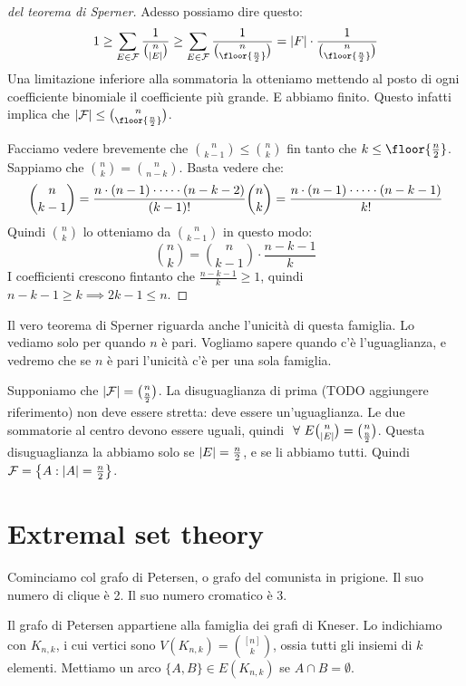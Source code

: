 \begin{proof}[del teorema di Sperner]
	Adesso possiamo dire questo:
	\[
		1 \ge \sum_{E \in \mathcal{F}} \frac{1}{\binom{n}{\abs{E}}} \ge \sum_{E \in \mathcal{F}} \frac{1}{\binom{n}{\floor{\frac{n}{2}}}} = \abs{F} \cdot \frac{1}{\binom{n}{\floor{\frac{n}{2}}}}
	\]
	Una limitazione inferiore alla sommatoria la otteniamo mettendo al posto di ogni coefficiente binomiale il coefficiente pi\`u grande.
	E abbiamo finito.
	Questo infatti implica che $\abs{\mathcal{F}} \le \binom{n}{\floor{\frac{n}{2}}}$.

	Facciamo vedere brevemente che $\binom{n}{k-1} \le \binom{n}{k}$ fin tanto che $k \le \floor{\frac{n}{2}}$.
	Sappiamo che $\binom{n}{k} = \binom{n}{n - k}$.
	Basta vedere che:
	\[
		\binom{n}{k-1} = \frac{n \cdot (n-1) \cdot \dots \cdot (n - k - 2)}{(k-1)!} \\
		\binom{n}{k} = \frac{n \cdot (n-1) \cdot \dots \cdot (n - k - 1)}{k!}
	\]
	Quindi $\binom{n}{k}$ lo otteniamo da $\binom{n}{k-1}$ in questo modo:
	\[
		\binom{n}{k} = \binom{n}{k-1} \cdot \frac{n - k - 1}{k}
	\]
	I coefficienti crescono fintanto che $\frac{n - k - 1}{k} \ge 1$, quindi $n - k - 1 \ge k \implies 2 k - 1 \le n$.
\end{proof}

Il vero teorema di Sperner riguarda anche l'unicit\`a di questa famiglia.
Lo vediamo solo per quando $n$ \`e pari.
Vogliamo sapere quando c'\`e l'uguaglianza, e vedremo che se $n$ \`e pari l'unicit\`a c'\`e per una sola famiglia.

Supponiamo che $\left\lvert{\mathcal{F}}\right\rvert = \binom{n}{\frac{n}{2}}$.
La disuguaglianza di prima (TODO aggiungere riferimento) non deve essere stretta: deve essere un'uguaglianza.
Le due sommatorie al centro devono essere uguali, quindi $\forall E \binom{n}{\abs{E}} = \binom{n}{\frac{n}{2}}$.
Questa disuguaglianza la abbiamo solo se $\left\lvert{E}\right\rvert = \frac{n}{2}$, e se li abbiamo tutti.
Quindi $\mathcal{F} = \left\{ A : \left\lvert{A}\right\rvert = \frac{n}{2} \right\}$.

\section{Extremal set theory}

Cominciamo col grafo di Petersen, o grafo del comunista in prigione.
Il suo numero di clique \`e 2.
Il suo numero cromatico \`e 3.

Il grafo di Petersen appartiene alla famiglia dei grafi di Kneser.
Lo indichiamo con $K_{n,k}$, i cui vertici sono $V(K_{n,k}) = \binom{[n]}{k}$, ossia tutti gli insiemi di $k$ elementi.
Mettiamo un arco $\{A,B\} \in E(K_{n,k})$ se $A \cap B = \emptyset$.

